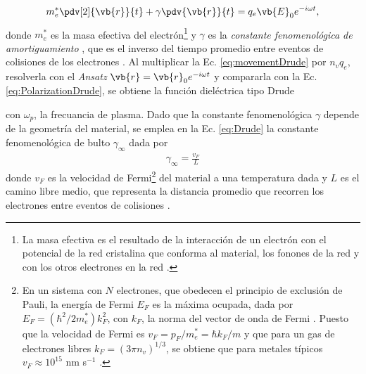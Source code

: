 	\begin{align}
	m_e^* \pdv[2]{\vb{r}}{t} +  \gamma \pdv{\vb{r}}{t} = q_e\vb{E}_0e^{-i\omega t},
	\label{eq:movementDrude}
	\end{align}
donde $m_e^*$ es la masa efectiva del electrón\footnote{La masa efectiva es el resultado de la interacción de un electrón con el potencial de la red cristalina que conforma al material, los fonones de la red y con los otros electrones en la red \cite{gross2014festkorperphysik}. } \cite{gross2014festkorperphysik} y $\gamma$ es la \emph{constante fenomenológica de amortiguamiento} \cite{kreibig1995clusters}, que es el inverso del tiempo promedio entre eventos de colisiones  de los electrones \cite{novotny2006principles,gross2014festkorperphysik}.  Al multiplicar la Ec.  \eqref{eq:movementDrude} por $n_v q_e$, resolverla con el \emph{Ansatz} $\vb{r} = \vb{r}_0e^{-i\omega t}$ y compararla con la Ec.  \eqref{eq:PolarizationDrude}, se obtiene la función dieléctrica tipo Drude \cite{novotny2006principles,gross2014festkorperphysik}  \vspace*{-.75em}
%
	\begin{tcolorbox}[title = Modelo de Drude-Sommerfeld, breakable ]
	\end{tcolorbox}\vspace*{-.75em}\noindent
%
con $\omega_p$, la frecuancia de plasma. Dado que la constante fenomenológica $\gamma$ depende de la geometría del material, se emplea en la Ec. \eqref{eq:Drude} la constante fenomenológica de bulto $\gamma_\infty$ dada por \cite{kreibig1995clusters} 
	\begin{align}
	\gamma_\infty = \frac{v_F}{L}
			 \label{eq:gammaInf}	
	\end{align}
donde $v_F$ es la velocidad de Fermi\footnote{En un sistema con $N$ electrones, que obedecen el principio  de exclusión de Pauli, la energía de Fermi $E_F$ es la máxima ocupada, dada por $E_F = (\hbar^2/2m_e^*)k_F^2$, con $k_F$, la norma del vector de onda de Fermi \cite{gross2014festkorperphysik}.  Puesto que la velocidad de Fermi es $v_F = p_F/m_e^* = \hbar k_F / m$ y que para un gas de electrones libres $k_F=(3\pi n_v)^{1/3}$, se obtiene que para metales típicos $v_F\approx 10^{15}$ nm s$^{-1}$ \cite{gross2014festkorperphysik}. } del material a una temperatura dada y $L$ es el camino libre medio, que representa la distancia promedio que recorren los electrones entre eventos de colisiones \cite{gross2014festkorperphysik}.  

